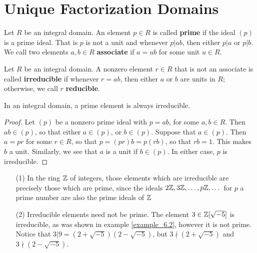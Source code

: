 \section{Unique Factorization Domains}
\label{section_6.3}

\begin{definition}
  Let $R$ be an integral domain. An element $p \in R$ is called \textbf{prime}
  if the ideal $(p)$ is a prime ideal. That is $p$ is not a unit and whenever
  $p|ab$, then either  $p|a$ or $p|b$. We call two elements $a,b \in R$
  \textbf{associate} if $a=ub$ for some unit $u \in R$.
\end{definition}


\begin{definition}
  Let $R$ be an integral domain. A nonzero element  $r \in R$ that is not an
  associate is called \textbf{irreducible} if whenever $r=ab$, then either $a$
  or $b$ are units in $R$; otherwise, we call $r$ \textbf{reducible}.
\end{definition}

\begin{lemma}\label{lemma_6.3.1}
  In an integral domain, a prime element is always irreducible.
\end{lemma}
\begin{proof}
  Let $(p)$ be a nonzero prime ideal with $p=ab$, for some  $a,b \in R$. Then
  $ab \in (p)$, so that either $a \in (p)$, or $b \in (p)$. Suppose that $a
  \in (p)$. Then $a=pr$ for some  $r \in R$, so that  $p=(pr)b=p(rb)$, so
  that $rb=1$. This makes $b$ a unit. Similarly, we see that $a$ is a unit if
  $b \in (p)$. In either case, $p$ is irreducible.
\end{proof}

\begin{example}\label{example_6.6}
  \begin{enumerate}
    \item[(1)] In the ring $\mathbb{Z}$ of integers, those elements which are
      irreducible are precisely those which are prime, since the ideals
      $2\mathbb{Z}, 3\mathbb{Z}, \dots, p\mathbb{Z}, \dots$ for  $p$ a prime number are also the
      prime ideals of $\mathbb{Z}$

    \item[(2)] Irreducible elements need not be prime. The element $3 \in
      \mathbb{Z}[\sqrt{-5}]$ is irreducible, as was shown in example
      \ref{example_6.2},
      however it is not prime. Notice that
      $3|9=(2+\sqrt{-5})(2-\sqrt{-5})$, but $3 \nmid (2+\sqrt{-5})$ and
      $3 \nmid (2-\sqrt{-5})$.
  \end{enumerate}
\end{example}

